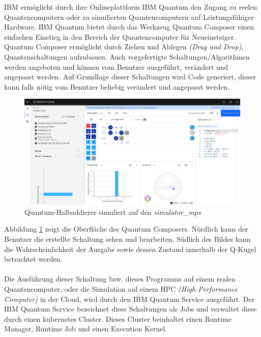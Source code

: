 IBM erm\"oglicht durch ihre Onlineplattform IBM Quantum \cite{IBM_Quantum} den Zugang zu reelen Quantencomputern oder zu simulierten Quantencomputern auf Leistungsf\"ahiger Hardware. IBM Quantum bietet durch das Werkzeug Quantum Composer einen einfachen Einstieg in den Bereich der Quantencomputer f\"ur Neueinsteiger. Quantum Composer erm\"oglicht durch Ziehen und Ablegen \textit{(Drag and Drop)}, Quantenschaltungen aufzubauen. Auch vorgefertigte Schaltungen/Algorithmen werden angeboten und k\"onnen vom Benutzer ausgef\"uhrt, ver\"andert und angepasst werden. Auf Grundlage dieser Schaltungen wird Code generiert, dieser kann falls n\"otig vom Benutzer beliebig ver\"andert und angepasst werden.
\begin{figure}[h]
\centering
\includegraphics[width=1\textwidth]{figures/half_adder_composer.png}
\caption{Quantum-Halbaddierer simuliert auf den \textit{simulator_mps}}
\label{fig:quantum-composer}
\end{figure}
Abbildung \ref{fig:quantum-composer} zeigt die Oberfl\"ache des Quantum Composers. N\"ordlich kann der Benutzer die erstellte Schaltung sehen und bearbeiten. S\"udlich des Bildes kann die Wahrscheinlichkeit der Ausgabe sowie dessen Zustand innerhalb der Q-Kugel betrachtet werden. \\\\
Die Ausf\"uhrung dieser Schaltung bzw. dieses Programms auf einem realen Quantencomputer, oder die Simulation auf einem HPC \textit{(High Performance Computer)} in der Cloud, wird durch den IBM Quantum Service ausgef\"uhrt. Der IBM Quantum Service bezeichnet diese Schaltungen als Jobs und verwaltet diese durch einen kubernetes Cluster. Dieses Cluster beinhaltet einen Runtime Manager, Runtime Job und einen Execution Kernel.\\\\

